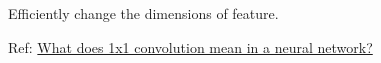\documentclass{subfiles}
\begin{document}
Efficiently change the dimensions of feature.

Ref: \href{https://stats.stackexchange.com/questions/194142/what-does-1x1-convolution-mean-in-a-neural-network}{What does 1x1 convolution mean in a neural network?}
\end{document}

